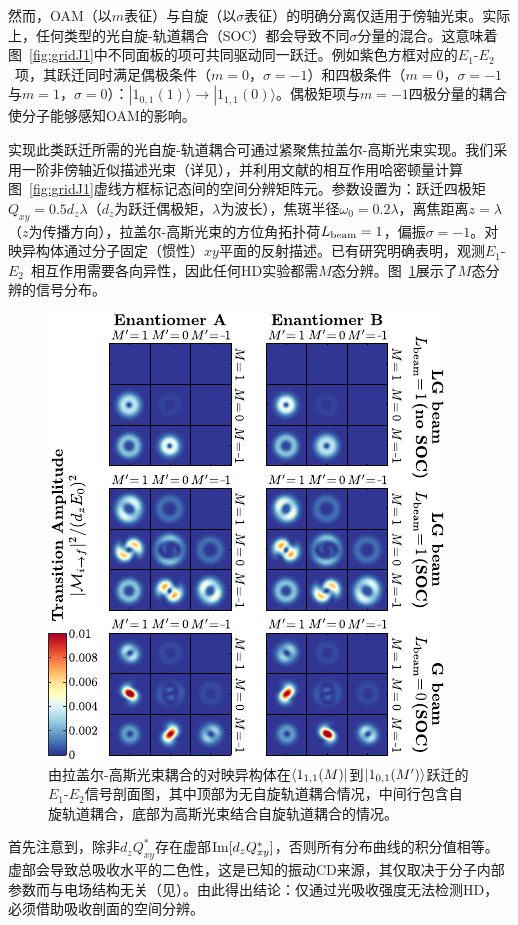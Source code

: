 \documentclass[reprint,aps,prl,twocolumn,superscriptaddress,groupedaddress]{revtex4-2}
\newcommand{\eoet}{$E_1$-$E_2$}
\begin{document}
然而，OAM（以$m$表征）与自旋（以$\sigma$表征）的明确分离仅适用于傍轴光束。实际上，任何类型的光自旋-轨道耦合（SOC）都会导致不同$\sigma$分量的混合\cite{Bliokh2015,Bliokh2023}。这意味着图~\ref{fig:gridJ1}中不同面板的项可共同驱动同一跃迁。例如紫色方框对应的\eoet~项，其跃迁同时满足偶极条件（$m=0$，$\sigma=-1$）和四极条件（$m=0$，$\sigma=-1$与$m=1$，$\sigma=0$）：$| 1_{0,1}(1) \rangle \to | 1_{1,1}(0) \rangle$。偶极矩项与$m=-1$四极分量的耦合使分子能够感知OAM的影响。

实现此类跃迁所需的光自旋-轨道耦合可通过紧聚焦拉盖尔-高斯光束实现\cite{Loeffler2011,Forbes2021nonparaxial,Forbes2021longitudinal}。我们采用一阶非傍轴近似描述光束\cite{Lax1975}（详见\cite{Note1}），并利用文献\cite{Maslov2024,Maslov_Thesis}的相互作用哈密顿量计算图~\ref{fig:gridJ1}虚线方框标记态间的空间分辨矩阵元。参数设置为：跃迁四极矩$Q_{xy}=0.5d_z\lambda$（$d_z$为跃迁偶极矩，$\lambda$为波长），焦斑半径$\omega_0=0.2\lambda$，离焦距离$z=\lambda$（$z$为传播方向），拉盖尔-高斯光束的方位角拓扑荷$L_{\rm beam}=1$，偏振$\sigma=-1$。对映异构体通过分子固定（惯性）$xy$平面的反射描述。已有研究明确表明\cite{Buckingham1971, Power1975}，观测\eoet~相互作用需要各向异性，因此任何HD实验都需$M$态分辨。图~\ref{fig:profiles}展示了$M$态分辨的信号分布。

\begin{figure}[t!]
    \centering
    \includegraphics[width=1.0\columnwidth]{Figure2.pdf}
    \caption{由拉盖尔-高斯光束耦合的对映异构体在$\bra{1_{1,1}(M)}$到$\ket{1_{0,1}(M')}$跃迁的\eoet 信号剖面图，其中顶部为无自旋轨道耦合情况，中间行包含自旋轨道耦合，底部为高斯光束结合自旋轨道耦合的情况。}
    \label{fig:profiles}
\end{figure}
首先注意到，除非$d_zQ_{xy}^*$存在虚部${\rm Im}[d_zQ_{xy}^*]$，否则所有分布曲线的积分值相等。虚部会导致总吸收水平的二色性，这是已知的振动CD来源，其仅取决于分子内部参数而与电场结构无关（见\cite{Buckingham1971}）。由此得出结论：仅通过光吸收强度无法检测HD，必须借助吸收剖面的空间分辨\cite{Loeffler2011}。
\end{document}
